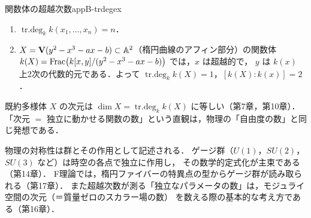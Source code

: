 \begin{myex}{関数体の超越次数}{appB-trdegex}
\begin{enumerate}
\item $\mathop{\mathrm{tr.deg}}\nolimits_k k(x_1,\dots,x_n)=n$．
\item $X=\mathbf{V}(y^2-x^3-ax-b)\subset\mathbb{A}^2$（楕円曲線のアフィン部分）の関数体
$k(X)=\operatorname{Frac}\bigl(k[x,y]/(y^2-x^3-ax-b)\bigr)$ では，$x$ は超越的で，
$y$ は $k(x)$ 上2次の代数的元である．よって $\mathop{\mathrm{tr.deg}}\nolimits_kk(X)=1$，$[k(X):k(x)]=2$．
\end{enumerate}
\end{myex}

既約多様体 $X$ の次元は $\dim X=\mathop{\mathrm{tr.deg}}\nolimits_kk(X)$ に等しい（第7章，第10章）．
「次元 $=$ 独立に動かせる関数の数」という直観は，物理の「自由度の数」と同じ発想である．

\begin{physbox}[対称性と群]
物理の対称性は群とその作用として記述される．
ゲージ群（$U(1)$，$SU(2)$，$SU(3)$ など）は時空の各点で独立に作用し，
その数学的定式化が主束である（第14章）．
F理論では，楕円ファイバーの特異点の型からゲージ群が読み取られる（第17章）．
また超越次数が測る「独立なパラメータの数」は，モジュライ空間の次元（＝質量ゼロのスカラー場の数）
を数える際の基本的な考え方である（第16章）．
\end{physbox}

